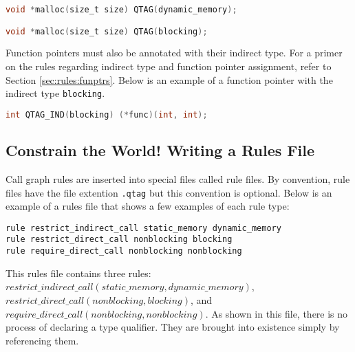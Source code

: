 \noindent\begin{minipage}[t]{\linewidth}
\begin{lstlisting}[language=C]
void *malloc(size_t size) QTAG(dynamic_memory);

void *malloc(size_t size) QTAG(blocking);
\end{lstlisting}
\end{minipage}

Function pointers must also be annotated with their indirect type.  For a primer on the rules regarding indirect type and function pointer assignment, refer to Section \ref{sec:rules:funptrs}.  Below is an example of a function pointer with the indirect type \lstinline{blocking}.

\noindent\begin{minipage}[t]{\linewidth}
\begin{lstlisting}[language=C++]
int QTAG_IND(blocking) (*func)(int, int);
\end{lstlisting}
\end{minipage}

\subsection{Constrain the World!  Writing a Rules File}\label{sec:operate:rules}

Call graph rules are inserted into special files called rule files.  By convention, rule files have the file extention \lstinline{.qtag} but this convention is optional.  Below is an example of a rules file that shows a few examples of each rule type:

\noindent\begin{minipage}[t]{\linewidth}
\begin{lstlisting}
rule restrict_indirect_call static_memory dynamic_memory
rule restrict_direct_call nonblocking blocking
rule require_direct_call nonblocking nonblocking
\end{lstlisting}
\end{minipage}

\begin{sloppypar}
This rules file contains three rules: $restrict\_indirect\_call(\allowbreak static\_memory,\allowbreak dynamic\_memory)$, $restrict\_direct\_call(\allowbreak nonblocking,\allowbreak blocking)$, and $require\_direct\_call(\allowbreak nonblocking,\allowbreak nonblocking)$.  As shown in this file, there is no process of declaring a type qualifier.  They are brought into existence simply by referencing them.  
\end{sloppypar}

